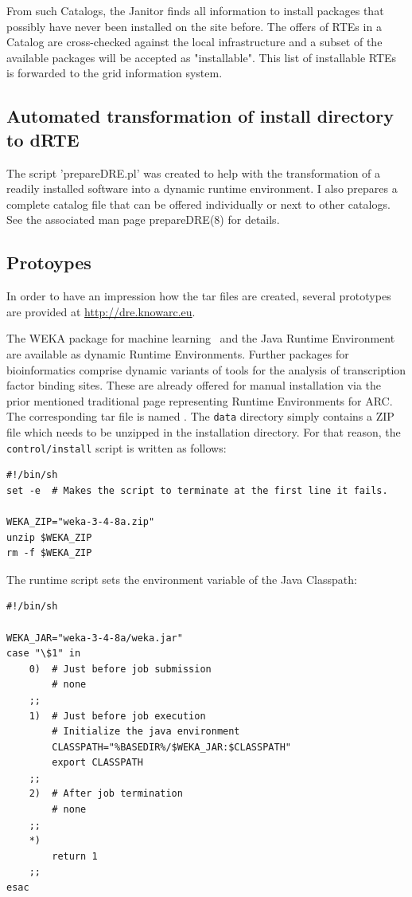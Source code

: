 From such Catalogs, the Janitor finds all information to install
packages that possibly have never been installed on the site before. The
offers of RTEs in a Catalog are cross-checked against the local
infrastructure and a subset of the available packages will be accepted as
"installable". This list of installable RTEs is forwarded to the grid
information system.

\subsection{Automated transformation of install directory to dRTE}

The script 'prepareDRE.pl' was created to help with the transformation
of a readily installed software into a dynamic runtime environment.
I also prepares a complete catalog file that can be offered
individually or next to other catalogs. See the associated man page
prepareDRE(8) for details.

\subsection{Protoypes}

In order to have an impression how the tar files are created, several
prototypes are provided at \url{http://dre.knowarc.eu}.

The WEKA package for machine learning~\cite{FRANK_20074} and the Java
Runtime Environment are available as dynamic Runtime Environments. Further
packages for bioinformatics comprise dynamic variants of tools for
the analysis of transcription factor binding sites. These are already
offered for manual installation via the prior mentioned traditional page
representing Runtime Environments for ARC.  The corresponding tar file
is named . The \texttt{data} directory simply contains
a ZIP file which needs to be unzipped in the installation directory. For
that reason, the \texttt{control/install} script is written as follows:

\begin{verbatim} 
#!/bin/sh
set -e  # Makes the script to terminate at the first line it fails.

WEKA_ZIP="weka-3-4-8a.zip"
unzip $WEKA_ZIP
rm -f $WEKA_ZIP
\end{verbatim}
The runtime script sets the environment variable of the Java Classpath:
\begin{verbatim}
#!/bin/sh

WEKA_JAR="weka-3-4-8a/weka.jar"
case "\$1" in
	0)	# Just before job submission
		# none
	;;
	1)	# Just before job execution
		# Initialize the java environment
		CLASSPATH="%BASEDIR%/$WEKA_JAR:$CLASSPATH"
		export CLASSPATH
	;;
	2)	# After job termination
		# none
	;;
	*)
		return 1
	;;
esac	
\end{verbatim}


